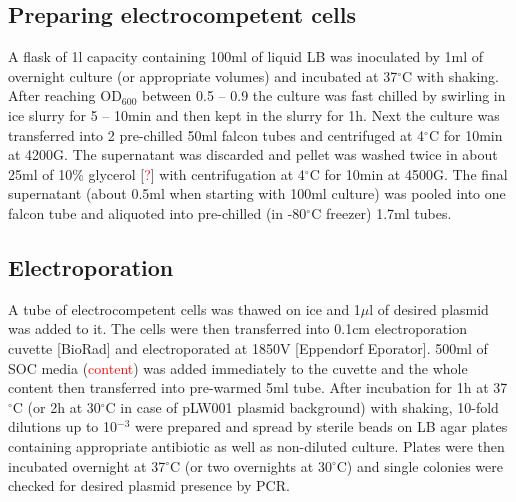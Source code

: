 \subsection{Preparing electrocompetent cells}
A flask of 1l capacity containing 100ml of liquid LB was inoculated by 1ml of overnight culture (or appropriate volumes) and incubated at 37$^{\circ}$C with shaking.
After reaching OD$_{600}$ between 0.5 -- 0.9 the culture was fast chilled by swirling in ice slurry for 5 -- 10min and then kept in the slurry for 1h.
Next the culture was transferred into 2 pre-chilled 50ml falcon tubes and centrifuged  at 4$^{\circ}$C for 10min at 4200G.
The supernatant was discarded and pellet was washed twice in about 25ml of 10\% glycerol [\textcolor{red}{?}] with centrifugation at 4$^{\circ}$C for 10min at 4500G.
The final supernatant (about 0.5ml when starting with 100ml culture) was pooled into one falcon tube and aliquoted into pre-chilled (in -80$^{\circ}$C freezer) 1.7ml tubes.

\subsection{Electroporation}
A tube of electrocompetent cells was thawed on ice and 1$\mu$l of desired plasmid was added to it.
The cells were then transferred into 0.1cm electroporation cuvette [BioRad] and electroporated at 1850V [Eppendorf Eporator\textsuperscript{\textregistered}].
500ml of SOC media (\textcolor{red}{content}) was added immediately to the cuvette and the whole content then transferred into pre-warmed 5ml tube.
After incubation for 1h at 37$^{\circ}$C (or 2h at 30$^{\circ}$C in case of pLW001 plasmid background) with shaking, 10-fold dilutions up to 10$^{-3}$ were prepared and spread by sterile beads on LB agar plates containing appropriate antibiotic as well as non-diluted culture.
Plates were then incubated overnight at 37$^{\circ}$C (or two overnights at 30$^{\circ}$C) and single colonies were checked for desired plasmid presence by PCR.

